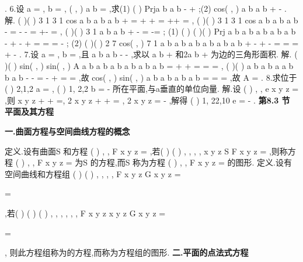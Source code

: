 \rho 
\rho 
\rho 
\rho 
\rho 
\rho 
\rho 
\rho 
\rho 
\rho 
\rho 
\rho 
\rho 
\rho 
\rho 
. 
6.设
a =
\rho 
,
b =
\rho 
, \cdot 
( , )
a b
\pi 
=
\rho 
\rho 
,求(1)
(
)
Prja b a
b
-
+
\rho 
\rho 
\rho 
\rho 
;(2)
\cdot 
cos(
,
)
a
b a
b
+
-
\rho 
\rho 
\rho 
\rho 
. 
解.
(
)(
)
3 1
3 1 cos
a
b
a
b
a
b
\pi 
+
=
+
\cdots 
+
=
++
\cdots 
\cdots \cdots 
=
\rho 
\rho 
\rho 
\rho 
\rho 
\rho 
, 
(
)(
)
3 1
3 1 cos
a
b
a
b
a
b
\pi 
-
=
-
\cdots 
-
=
+-\cdots 
\cdots \cdots 
=
\rho 
\rho 
\rho 
\rho 
\rho 
\rho 
, 
(
)(
)
3 1
a
b
a
b
+
\cdots 
-
=
-=
\rho 
\rho 
\rho 
\rho 
; 
(1)
(
)
(
)(
)
Prj
a b
a
b
a
b
a
b
a
b
-
+
\cdots 
-
+
=
=
=
-
\rho 
\rho 
\rho 
\rho 
\rho 
\rho 
\rho 
\rho 
\rho 
\rho 
; 
(2)
\cdot 
(
)(
)
2 7
cos(
,
)
7 1
a
b
a
b
a
b a
b
a
b a
b
+
\cdots 
-
+
-
=
=
=
\cdots 
+
-
\rho 
\rho 
\rho 
\rho 
\rho 
\rho 
\rho 
\rho 
\rho 
\rho 
\rho 
\rho 
. 
7.设
a =
\rho 
,
b =
\rho 
,且
a
b
a
b
-
\bot
-
\rho 
\rho 
\rho 
\rho 
,求以
a
b
+
\rho 
\rho 
和2a
b
+
\rho 
\rho 
为边的三角形面积. 
解.
(
)(
)
\cdot 
\cdot 
sin( , )
sin( , )
A
a
b
a
b
a
b
a b
a b
a b
=
+
\times 
+
=
\times 
=
=
\rho 
\rho 
\rho 
\rho 
\rho 
\rho 
\rho 
\rho 
\rho 
\rho 
\rho 
\rho 
, 
(
)(
)
a
b
a
b
a
a b
b
a b
-
\cdots 
-
=
\Rightarrow 
-
\cdots 
+
=
\Rightarrow 
\cdots 
=
\rho 
\rho 
\rho 
\rho 
\rho 
\rho 
\rho 
\rho 
\rho 
\rho 
,故 
\cdot 
\cdot 
cos( , )
sin( , )
a b
a b
a b
a b
\cdots 
=
=
\Rightarrow 
=
\rho 
\rho 
\rho 
\rho 
\rho 
\rho 
\rho 
\rho 
,故
A =
. 
8.求位于
(
)
2,1,2
a =
\rho 
,
(
)
1, 2,2
b =
-
\rho 
所在平面,与a\rho 垂直的单位向量. 
解.设
(
)
, ,
e
x y z
=
\rho 
,则
x
y
z
+
+
=, 2
x
y
z
+
+
=
, 2
x
y
z
=
-
,解得 
(
)
1, 22,10
e =\pm 
-
\rho 
. 
\vspace{6pt}
{\large \bfseries \textcolor{lyred}{第8.3 节 平面及其方程}}

\vspace{4pt}
{\bfseries \textcolor{lyred}{一.曲面方程与空间曲线方程的概念}}

\textcolor{lyred}{定义}.设有曲面S 和方程
(
)
, ,
F x y z =
,若(
)
(
)
, ,
, ,
x y z
S
F x y z
\in 
\Leftrightarrow 
=
,则称方程 
(
)
, ,
F x y z =
为S 的\textcolor{lyred}{方程},而S 称为方程
(
)
, ,
F x y z =
的\textcolor{lyred}{图形}. 
\textcolor{lyred}{定义}.设有空间曲线\Gamma 和方程组
(
)
(
)
, ,
, ,
F x y z
G x y z
=

=

,若(
)
(
)
(
)
, ,
, ,
, ,
F x y z
x y z
G x y z
=

\in \Gamma \Leftrightarrow 
=

, 
则此方程组称为\Gamma 的\textcolor{lyred}{方程},而\Gamma 称为方程组的\textcolor{lyred}{图形}. 
\vspace{4pt}
{\bfseries \textcolor{lyred}{二.平面的点法式方程}}

